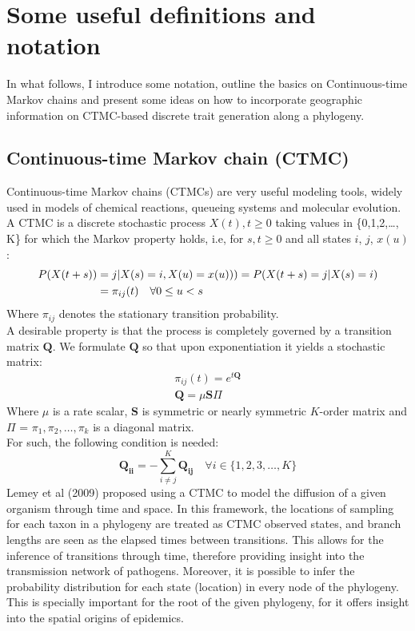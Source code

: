 \documentclass[a4paper,10pt]{article}
\begin{document}
\section{Some useful definitions and notation}
\indent In what follows, I introduce some notation, outline the basics on Continuous-time Markov chains and present some ideas on how to incorporate geographic information on CTMC-based discrete trait generation along a phylogeny.\\
\subsection{Continuous-time Markov chain (CTMC)}
\indent Continuous-time Markov chains (CTMCs) are very useful modeling tools, widely used in models of chemical reactions, queueing systems and molecular evolution. A CTMC is a discrete stochastic process $X(t), t\geq0$ taking values in \{0,1,2,\ldots, K\} for which the Markov property holds, i.e, for $s,t\geq 0$ and all states $i$, $j$, $x(u)$:
\begin{equation}
\label{ctmc}
\begin{split}
P(X(t+s)) &= j|X(s) =i, X(u)=x(u))) = P(X(t+s)=j|X(s)=i)\\ 
& = \pi_{ij}(t) \quad \forall \space 0\leq u < s
\end{split}
\end{equation}
Where $\pi_{ij}$ denotes the stationary transition probability.\\
\indent A desirable property is that the process is completely governed by a transition matrix $\mathbf{Q}$. We formulate $\mathbf{Q}$ so that upon exponentiation it yields a stochastic matrix:
\begin{align}
\label{qform}
 \pi_{ij}(t) = e^{t\mathbf{Q}} \\
 \mathbf{Q} = \mu\mathbf{S}\Pi
\end{align}
Where $\mu$ is a rate scalar, $\mathbf{S}$ is symmetric or nearly symmetric $K$-order matrix and $\Pi$ = $\pi_1, \pi_2,\ldots, \pi_k$ is a diagonal matrix.\\
\indent For such, the following condition is needed:
\begin{equation}
\mathbf{Q_{ii}} = -\sum_{i \neq j}^K{\mathbf{Q_{ij}}}  \quad \forall{ i \in \{1,2,3,\ldots,K\}}
\label{sumconst}
\end{equation}
\indent Lemey et al (2009) \cite{Lemey2009} proposed using a CTMC to model the diffusion of a given organism through time and space. In this framework, the locations of sampling for each taxon in a phylogeny are treated as CTMC observed states, and branch lengths are seen as the elapsed times between transitions. This allows for the inference of transitions through time, therefore providing insight into the transmission network of pathogens. Moreover, it is possible to infer the probability distribution for each state (location) in every node of the phylogeny. This is specially important for the root of the given phylogeny, for it offers insight into the spatial origins of epidemics.\\
\end{document}

